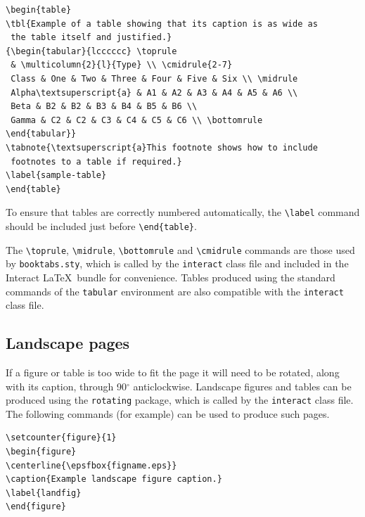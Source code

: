 \documentclass[]{interact}
\theoremstyle{plain}%
\theoremstyle{definition}
\theoremstyle{remark}
\begin{document}
\begin{verbatim}
\begin{table}
\tbl{Example of a table showing that its caption is as wide as
 the table itself and justified.}
{\begin{tabular}{lcccccc} \toprule
 & \multicolumn{2}{l}{Type} \\ \cmidrule{2-7}
 Class & One & Two & Three & Four & Five & Six \\ \midrule
 Alpha\textsuperscript{a} & A1 & A2 & A3 & A4 & A5 & A6 \\
 Beta & B2 & B2 & B3 & B4 & B5 & B6 \\
 Gamma & C2 & C2 & C3 & C4 & C5 & C6 \\ \bottomrule
\end{tabular}}
\tabnote{\textsuperscript{a}This footnote shows how to include
 footnotes to a table if required.}
\label{sample-table}
\end{table}
\end{verbatim}

To ensure that tables are correctly numbered automatically, the \texttt{\textbackslash{}label} command should be included just before \texttt{\textbackslash{}end\{table\}}.

The \texttt{\textbackslash{}toprule}, \texttt{\textbackslash{}midrule}, \texttt{\textbackslash{}bottomrule} and \texttt{\textbackslash{}cmidrule} commands are those used by \texttt{booktabs.sty}, which is called by the \texttt{interact} class file and included in the \textsf{Interact} \LaTeX~bundle for convenience. Tables produced using the standard commands of the \texttt{tabular} environment are also compatible with the \texttt{interact} class file.

\hypertarget{landscape-pages}{%
\subsection{Landscape pages}\label{landscape-pages}}

If a figure or table is too wide to fit the page it will need to be rotated, along with its caption, through 90\(^{\circ}\) anticlockwise. Landscape figures and tables can be produced using the \texttt{rotating} package, which is called by the \texttt{interact} class file. The following commands (for example) can be used to produce such pages.

\begin{verbatim}
\setcounter{figure}{1}
\begin{figure}
\centerline{\epsfbox{figname.eps}}
\caption{Example landscape figure caption.}
\label{landfig}
\end{figure}
\end{verbatim}
\end{document}
